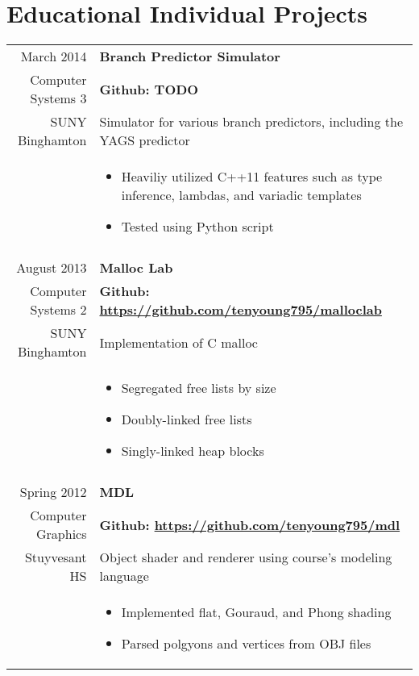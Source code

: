 \documentclass[letterpaper,10pt]{article} %
\begin{document}
\section{Educational Individual Projects}

\begin{longtable}{r|p{4.5in}}

    March 2014 & \textbf{Branch Predictor Simulator} \\
    Computer Systems 3 & \textbf{Github: TODO} \\
    SUNY Binghamton & Simulator for various branch predictors, including the YAGS predictor \\
    & \begin{itemize}
        \item Heaviliy utilized C++11 features such as type inference, lambdas, and variadic templates
        \item Tested using Python script
    \end{itemize} \\

    \multicolumn{2}{c}{} \\

    August 2013 & \textbf{Malloc Lab} \\
    Computer Systems 2 & \textbf{Github: \url{https://github.com/tenyoung795/malloclab}} \\
    SUNY Binghamton & Implementation of C malloc \\
    & \begin{itemize}
        \item Segregated free lists by size
        \item Doubly-linked free lists
        \item Singly-linked heap blocks
    \end{itemize} \\

    \multicolumn{2}{c}{} \\

    Spring 2012 & \textbf{MDL} \\
    Computer Graphics & \textbf{Github: \url{https://github.com/tenyoung795/mdl}} \\
    Stuyvesant HS & Object shader and renderer using course's modeling language \\
    & \begin{itemize}
        \item Implemented flat, Gouraud, and Phong shading
        \item Parsed polgyons and vertices from OBJ files
    \end{itemize}

\end{longtable}
\end{document}
